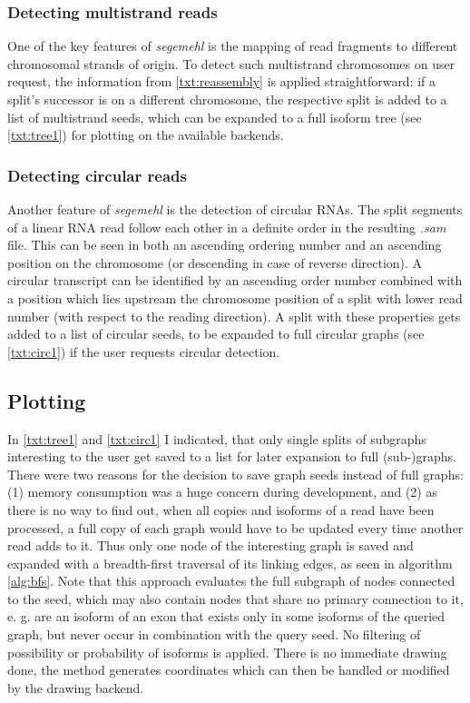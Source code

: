 \documentclass[11pt]{article}
\begin{document}
\subsubsection{Detecting multistrand reads}
\label{sec-2-3-2}

One of the key features of \emph{segemehl} is the mapping of read fragments to different chromosomal
strands of origin. To detect such multistrand chromosomes on user request, the information from
\ref{txt:reassembly} is applied straightforward: if a split's successor is on a different
chromosome, the respective split is added to a list of multistrand seeds, which can be expanded
to a full isoform tree (see \ref{txt:tree1}) for plotting on the available backends.


\subsubsection{Detecting circular reads}
\label{sec-2-3-3}

Another feature of \emph{segemehl} is the detection of circular RNAs.
The split segments of a linear RNA read follow each other in a definite order in the resulting
\emph{.sam} file. This can be seen in both an ascending ordering number and an ascending position on
the chromosome (or descending in case of reverse direction). A circular transcript can
be identified by an ascending order number combined with a position which lies upstream the
chromosome position of a split with lower read number (with respect to the reading direction).
A split with these properties gets added to a list of circular seeds, to be expanded to full
circular graphs (see \ref{txt:circ1}) if the user requests circular detection.


\subsection{Plotting}
\label{sec-2-4}
\label{txt:bfs}

In \ref{txt:tree1} and \ref{txt:circ1} I indicated, that only single splits of subgraphs
interesting to the user get saved to a list for later expansion to full (sub-)graphs.
There were two reasons for the decision to save graph seeds instead of full graphs:
(1) memory consumption was a huge concern during development, and
(2) as there is no way to find out, when all copies and isoforms of a read have been processed,
a full copy of each graph would have to be updated every time another read adds to it.
Thus only one node of the interesting graph is saved and expanded with a breadth-first traversal
of its linking edges, as seen in algorithm \ref{alg:bfs}.
Note that this approach evaluates the full subgraph of nodes connected to the seed, which may
also contain nodes that share no primary connection to it, e. g. are an isoform of an exon that
exists only in some isoforms of the queried graph, but never occur in combination with the query
seed.
No filtering of possibility or probability of isoforms is applied.
There is no immediate drawing done, the method generates coordinates which can then be handled
or modified by the drawing backend.
\end{document}

